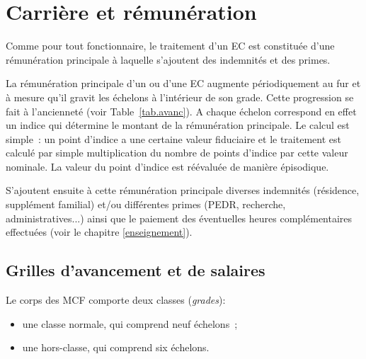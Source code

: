 
\section{Carri\`ere et r\'emun\'eration}
\label{salairesEC}

Comme pour tout fonctionnaire, le traitement d'un EC est constitu\'ee
d'une r\'emun\'eration principale \`a laquelle s'ajoutent des indemnit\'es et des primes.

La r\'emun\'eration principale d'un ou d'une EC augmente
p\'e\-rio\-di\-quement au fur et \`a mesure qu'il gravit les
\'echelons \`a l'int\'erieur de son grade. Cette progression se fait \`a l'anciennet\'e (voir Table~\ref{tab.avanc}).
A chaque \'echelon correspond en effet un indice qui d\'etermine le montant de la
r\'emun\'eration principale. Le calcul est simple~: un point
d'indice a une certaine valeur fiduciaire et le traitement est
calcul\'e par simple multiplication du nombre de points d'indice par
cette valeur nominale. La valeur du point d'indice est
r\'e\'evalu\'ee de mani\`ere \'episodique.

S'ajoutent ensuite \`a cette r\'emun\'eration principale diverses indemnit\'es
(r\'esidence, suppl\'ement familial)
et/ou diff\'erentes primes (PEDR, recherche, administratives...)
ainsi que le paiement des \'eventuelles heures compl\'emen\-taires effectu\'ees
(voir le chapitre \ref{enseignement}).


\subsection{Grilles d'avancement et de salaires}\label{sec. grilles}

Le corps des MCF comporte deux classes
(\textit{grades}):
\begin{itemize}
\item une classe normale, qui comprend neuf \'echelons~;
\item une hors-classe, qui comprend six \'echelons.
\end{itemize}

